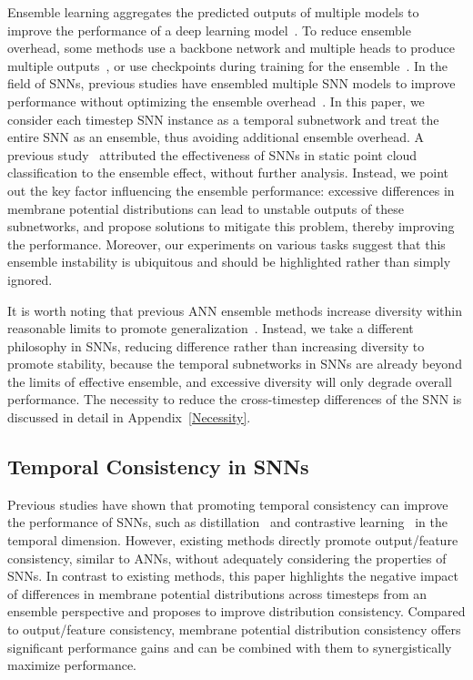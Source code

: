 Ensemble learning aggregates the predicted outputs of multiple models to improve the performance of a deep learning model~\citep{rokach2010ensemble,allen2020towards}. To reduce ensemble overhead, some methods use a backbone network and multiple heads to produce multiple outputs~\citep{tran2020hydra,RuanSMAIFD23}, or use checkpoints during training for the ensemble~\citep{furlanello2018born,lee2022learning}. In the field of SNNs, previous studies have ensembled multiple SNN models to improve performance without optimizing the ensemble overhead~\citep{neculae2021ensemblesspikingneuralnetworks,9308568,7966177,10160749}. In this paper, we consider each timestep SNN instance as a temporal subnetwork and treat the entire SNN as an ensemble, thus avoiding additional ensemble overhead. A previous study~\citep{ren2023spiking} attributed the effectiveness of SNNs in static point cloud classification to the ensemble effect, without further analysis. Instead, we point out the key factor influencing the ensemble performance: excessive differences in membrane potential distributions can lead to unstable outputs of these subnetworks, and propose solutions to mitigate this problem, thereby improving the performance. Moreover, our experiments on various tasks suggest that this ensemble instability is ubiquitous and should be highlighted rather than simply ignored.

It is worth noting that previous ANN ensemble methods increase diversity within reasonable limits to promote generalization~\citep{9677845,NEURIPS2020_b86e8d03}. Instead, we take a different philosophy in SNNs, reducing difference rather than increasing diversity to promote stability, because the temporal subnetworks in SNNs are already beyond the limits of effective ensemble, and excessive diversity will only degrade overall performance. The necessity to reduce the cross-timestep differences of the SNN is discussed in detail in Appendix~\ref{Necessity}.

\vspace{-0.1cm}
\subsection{Temporal Consistency in SNNs}
\vspace{-0.1cm}

Previous studies have shown that promoting temporal consistency can improve the performance of SNNs, such as distillation~\citep{TSSD,TKS} and contrastive learning~\citep{temporalcontrastivelearningspiking} in the temporal dimension. However, existing methods directly promote output/feature consistency, similar to ANNs, without adequately considering the properties of SNNs. In contrast to existing methods, this paper highlights the negative impact of differences in membrane potential distributions across timesteps from an ensemble perspective and proposes to improve distribution consistency. Compared to output/feature consistency, membrane potential distribution consistency offers significant performance gains and can be combined with them to synergistically maximize performance.

\vspace{-0.2cm}